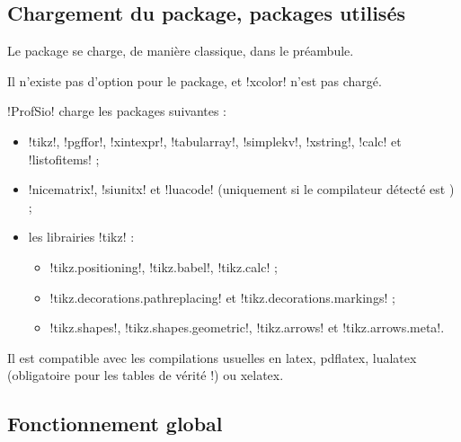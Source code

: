 \documentclass[french,a4paper,11pt]{article}
\begin{document}
{{\subsection{Chargement du package, packages utilisés}

\begin{importantblock}
Le package se charge, de manière classique, dans le préambule.

Il n'existe pas d'option pour le package, et \packagetex!xcolor! n'est pas chargé.
\end{importantblock}


\begin{noteblock}
\packagetex!ProfSio! charge les packages suivantes :

\begin{itemize}
	\item \packagetex!tikz!, \packagetex!pgffor!, \packagetex!xintexpr!, \packagetex!tabularray!, \packagetex!simplekv!, \packagetex!xstring!, \packagetex!calc! et \packagetex!listofitems! ;
	\item \packagetex!nicematrix!, \packagetex!siunitx! et \packagetex!luacode! (uniquement si le compilateur détecté est ) ;
	\item les librairies \packagetex!tikz! :
	\begin{itemize}
		\item \motcletex!tikz.positioning!, \motcletex!tikz.babel!, \motcletex!tikz.calc! ;
		\item \motcletex!tikz.decorations.pathreplacing! et \motcletex!tikz.decorations.markings! ;
		\item \motcletex!tikz.shapes!, \motcletex!tikz.shapes.geometric!, \motcletex!tikz.arrows! et \motcletex!tikz.arrows.meta!.
	\end{itemize}
\end{itemize}

Il est compatible avec les compilations usuelles en \textsf{latex}, \textsf{pdflatex}, \textsf{lualatex} (obligatoire pour les tables de vérité !) ou \textsf{xelatex}.
\end{noteblock}

\subsection{Fonctionnement global}

}}
\end{document}
